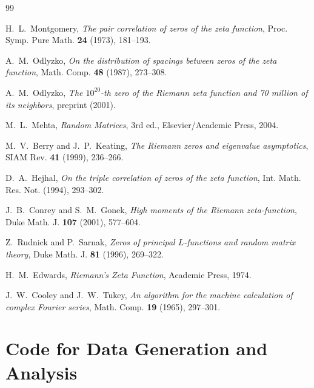 \documentclass[11pt]{amsart}
\begin{document}
\begin{thebibliography}{99}

H.~L.~Montgomery, 
\emph{The pair correlation of zeros of the zeta function}, 
Proc. Symp. Pure Math. \textbf{24} (1973), 181--193.

A.~M.~Odlyzko, 
\emph{On the distribution of spacings between zeros of the zeta function}, 
Math. Comp. \textbf{48} (1987), 273--308.

A.~M.~Odlyzko, 
\emph{The $10^{20}$-th zero of the Riemann zeta function and 70 million of its neighbors}, 
preprint (2001).

M.~L.~Mehta, 
\emph{Random Matrices}, 
3rd ed., Elsevier/Academic Press, 2004.

M.~V.~Berry and J.~P.~Keating, 
\emph{The Riemann zeros and eigenvalue asymptotics}, 
SIAM Rev. \textbf{41} (1999), 236--266.

D.~A.~Hejhal, 
\emph{On the triple correlation of zeros of the zeta function}, 
Int. Math. Res. Not. (1994), 293--302.

J.~B.~Conrey and S.~M.~Gonek, 
\emph{High moments of the Riemann zeta-function}, 
Duke Math. J. \textbf{107} (2001), 577--604.

Z.~Rudnick and P.~Sarnak, 
\emph{Zeros of principal $L$-functions and random matrix theory}, 
Duke Math. J. \textbf{81} (1996), 269--322.

H.~M.~Edwards, 
\emph{Riemann's Zeta Function}, 
Academic Press, 1974.

J.~W.~Cooley and J.~W.~Tukey, 
\emph{An algorithm for the machine calculation of complex Fourier series}, 
Math. Comp. \textbf{19} (1965), 297--301.

\end{thebibliography}

\appendix

\section{Code for Data Generation and Analysis}
\label{app:code}
\end{document}
